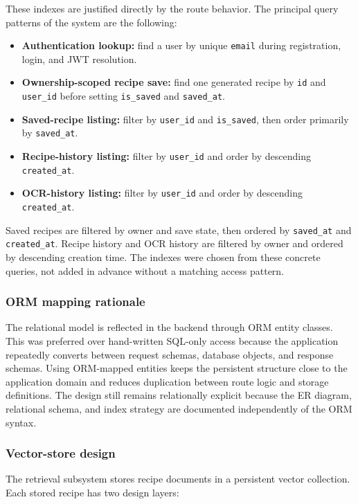 These indexes are justified directly by the route behavior. The
principal query patterns of the system are the following:

\begin{itemize}
	\item \textbf{Authentication lookup:} find a user by unique
	\texttt{email} during registration, login, and JWT resolution.
	\item \textbf{Ownership-scoped recipe save:} find one generated recipe
	by \texttt{id} and \texttt{user\_id} before setting
	\texttt{is\_saved} and \texttt{saved\_at}.
	\item \textbf{Saved-recipe listing:} filter by \texttt{user\_id} and
	\texttt{is\_saved}, then order primarily by \texttt{saved\_at}.
	\item \textbf{Recipe-history listing:} filter by \texttt{user\_id} and
	order by descending \texttt{created\_at}.
	\item \textbf{OCR-history listing:} filter by \texttt{user\_id} and
	order by descending \texttt{created\_at}.
\end{itemize}

Saved recipes are filtered by owner and save state, then ordered by
\texttt{saved\_at} and \texttt{created\_at}. Recipe history and OCR
history are filtered by owner and ordered by descending creation time.
The indexes were chosen from these concrete queries, not added in
advance without a matching access pattern.

\subsubsection{ORM mapping rationale}

The relational model is reflected in the backend through ORM entity
classes. This was preferred over hand-written SQL-only access because
the application repeatedly converts between request schemas, database
objects, and response schemas. Using ORM-mapped entities keeps the
persistent structure close to the application domain and reduces
duplication between route logic and storage definitions. The design
still remains relationally explicit because the ER diagram, relational
schema, and index strategy are documented independently of the ORM
syntax.

\subsubsection{Vector-store design}

The retrieval subsystem stores recipe documents in a persistent vector
collection. Each stored recipe has two design layers:

